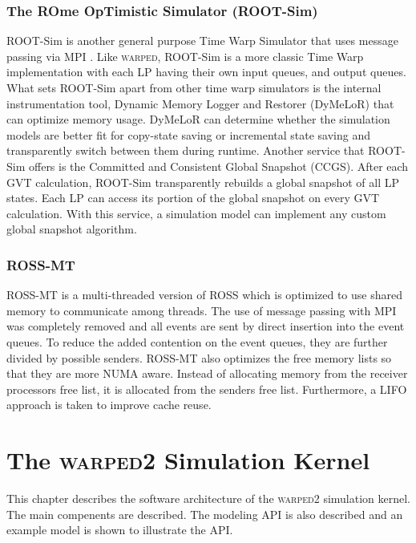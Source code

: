 \documentclass[11pt]{book}
\begin{document}
\subsection{The ROme OpTimistic Simulator (ROOT-Sim)}

ROOT-Sim is another general purpose Time Warp Simulator that uses message passing via MPI
\cite{pellegrini-11}. Like \textsc{warped}, ROOT-Sim is a more classic Time Warp
implementation with each LP having their own input queues, and output queues. What sets
ROOT-Sim apart from other time warp simulators is the internal instrumentation tool, Dynamic
Memory Logger and Restorer (DyMeLoR) that can optimize memory usage. DyMeLoR can determine
whether the simulation models are better fit for copy-state saving or incremental state
saving and transparently switch between them during runtime. Another service that ROOT-Sim
offers is the Committed and Consistent Global Snapshot (CCGS). After each GVT calculation,
ROOT-Sim transparently rebuilds a global snapshot of all LP states. Each LP can access its
portion of the global snapshot on every GVT calculation. With this service, a simulation
model can implement any custom global snapshot algorithm.

\subsection{ROSS-MT}

ROSS-MT\cite{jagtap-12} is a multi-threaded version of ROSS which is optimized to use shared
memory to communicate among threads. The use of message passing with MPI was completely
removed and all events are sent by direct insertion into the event queues. To reduce the
added contention on the event queues, they are further divided by possible senders. ROSS-MT
also optimizes the free memory lists so that they are more NUMA aware. Instead of allocating
memory from the receiver processors free list, it is allocated from the senders free list.
Furthermore, a LIFO approach is taken to improve cache reuse.



\chapter{The \textsc{warped2} Simulation Kernel}\label{warped2_overview}

This chapter describes the software architecture of the \textsc{warped2} simulation kernel.
The main compenents are described. The modeling API is also described and an example model
is shown to illustrate the API.
\end{document}
